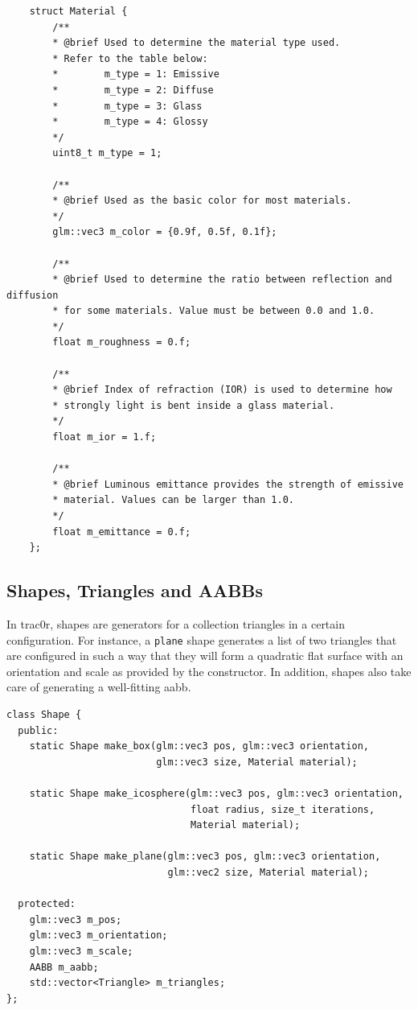 \documentclass[
  twoside,
  11pt, a4paper,
  footinclude=true,
  headinclude=true,
  cleardoublepage=empty
]{scrreprt}
\begin{document}
\begin{verbatim}
    struct Material {
        /**
        * @brief Used to determine the material type used.
        * Refer to the table below:
        *        m_type = 1: Emissive
        *        m_type = 2: Diffuse
        *        m_type = 3: Glass
        *        m_type = 4: Glossy
        */
        uint8_t m_type = 1;

        /**
        * @brief Used as the basic color for most materials.
        */
        glm::vec3 m_color = {0.9f, 0.5f, 0.1f};

        /**
        * @brief Used to determine the ratio between reflection and diffusion
        * for some materials. Value must be between 0.0 and 1.0.
        */
        float m_roughness = 0.f;

        /**
        * @brief Index of refraction (IOR) is used to determine how
        * strongly light is bent inside a glass material.
        */
        float m_ior = 1.f;

        /**
        * @brief Luminous emittance provides the strength of emissive
        * material. Values can be larger than 1.0.
        */
        float m_emittance = 0.f;
    };
\end{verbatim}

\subsection{Shapes, Triangles and AABBs}

In trac0r, shapes are generators for a collection triangles in a certain configuration. For
instance, a \texttt{plane} shape generates a list of two triangles that are configured in such a way
that they will form a quadratic flat surface with an orientation and scale as provided by the
constructor. In addition, shapes also take care of generating a well-fitting \ac{aabb}.

\begin{verbatim}
class Shape {
  public:
    static Shape make_box(glm::vec3 pos, glm::vec3 orientation,
                          glm::vec3 size, Material material);

    static Shape make_icosphere(glm::vec3 pos, glm::vec3 orientation,
                                float radius, size_t iterations,
                                Material material);

    static Shape make_plane(glm::vec3 pos, glm::vec3 orientation,
                            glm::vec2 size, Material material);

  protected:
    glm::vec3 m_pos;
    glm::vec3 m_orientation;
    glm::vec3 m_scale;
    AABB m_aabb;
    std::vector<Triangle> m_triangles;
};
\end{verbatim}
\end{document}
